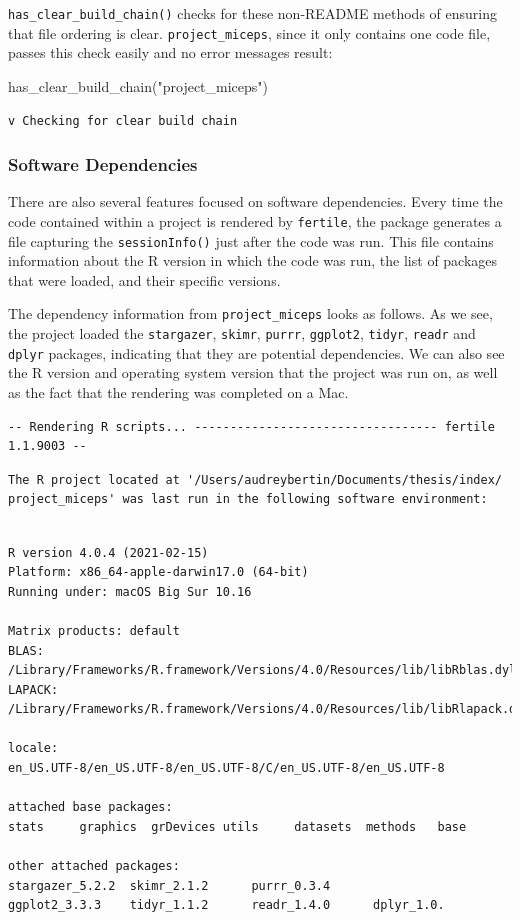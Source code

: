 \documentclass[12pt,twoside]{reedthesis}
\newenvironment{Shaded}{\begin{snugshade}}{\end{snugshade}}
\newcommand{\FunctionTok}[1]{\textcolor[rgb]{0.00,0.00,0.00}{#1}}
\newcommand{\NormalTok}[1]{#1}
\newcommand{\StringTok}[1]{\textcolor[rgb]{0.31,0.60,0.02}{#1}}
\begin{document}
\texttt{has\_clear\_build\_chain()} checks for these non-README methods of ensuring that file ordering is clear. \texttt{project\_miceps}, since it only contains one code file, passes this check easily and no error messages result:
\begin{Shaded}
\begin{Highlighting}[]
\FunctionTok{has\_clear\_build\_chain}\NormalTok{(}\StringTok{"project\_miceps"}\NormalTok{)}
\end{Highlighting}
\end{Shaded}
\begin{verbatim}
v Checking for clear build chain
\end{verbatim}
\hypertarget{software-dependencies}{%
\subsubsection{Software Dependencies}\label{software-dependencies}}

There are also several features focused on software dependencies. Every time the code contained within a project is rendered by \texttt{fertile}, the package generates a file capturing the \texttt{sessionInfo()} just after the code was run. This file contains information about the R version in which the code was run, the list of packages that were loaded, and their specific versions.

The dependency information from \texttt{project\_miceps} looks as follows. As we see, the project loaded the \texttt{stargazer}, \texttt{skimr}, \texttt{purrr}, \texttt{ggplot2}, \texttt{tidyr}, \texttt{readr} and \texttt{dplyr} packages, indicating that they are potential dependencies. We can also see the R version and operating system version that the project was run on, as well as the fact that the rendering was completed on a Mac.

\small
\begin{verbatim}
-- Rendering R scripts... ---------------------------------- fertile 1.1.9003 --
\end{verbatim}
\begin{verbatim}
The R project located at '/Users/audreybertin/Documents/thesis/index/
project_miceps' was last run in the following software environment:
\end{verbatim}
\begin{verbatim}

R version 4.0.4 (2021-02-15)
Platform: x86_64-apple-darwin17.0 (64-bit)
Running under: macOS Big Sur 10.16

Matrix products: default
BLAS:   /Library/Frameworks/R.framework/Versions/4.0/Resources/lib/libRblas.dylib
LAPACK: /Library/Frameworks/R.framework/Versions/4.0/Resources/lib/libRlapack.dylib

locale:
en_US.UTF-8/en_US.UTF-8/en_US.UTF-8/C/en_US.UTF-8/en_US.UTF-8

attached base packages:
stats     graphics  grDevices utils     datasets  methods   base     

other attached packages:
stargazer_5.2.2  skimr_2.1.2      purrr_0.3.4     
ggplot2_3.3.3    tidyr_1.1.2      readr_1.4.0      dplyr_1.0.
\end{verbatim}
\normalsize
\end{document}
